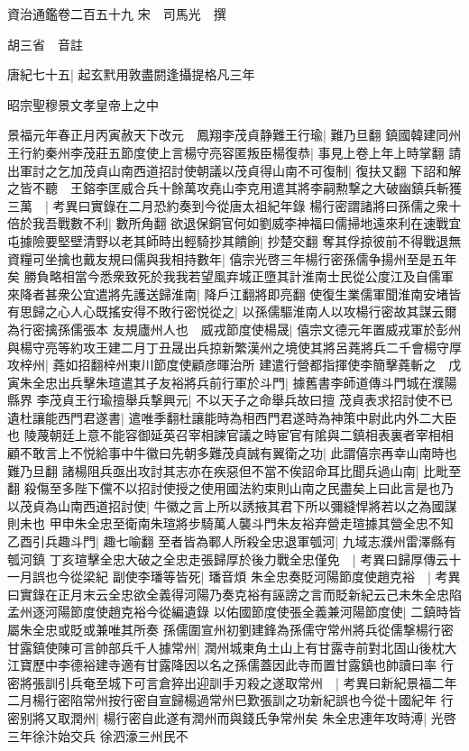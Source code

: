 資治通鑑卷二百五十九
宋　司馬光　撰

胡三省　音註

唐紀七十五|{
	起玄黓用敦盡閼逢攝提格凡三年}


昭宗聖穆景文孝皇帝上之中

景福元年春正月丙寅赦天下改元　鳳翔李茂貞静難王行瑜|{
	難乃旦翻}
鎮國韓建同州王行約秦州李茂莊五節度使上言楊守亮容匿叛臣楊復恭|{
	事見上卷上年上時掌翻}
請出軍討之乞加茂貞山南西道招討使朝議以茂貞得山南不可復制|{
	復扶又翻}
下詔和解之皆不聽　王鎔李匡威合兵十餘萬攻堯山李克用遣其將李嗣勲撃之大破幽鎮兵斬獲三萬　|{
	考異曰實錄在二月恐約奏到今從唐太祖紀年錄}
楊行密謂諸將曰孫儒之衆十倍於我吾戰數不利|{
	數所角翻}
欲退保銅官何如劉威李神福曰儒掃地遠來利在速戰宜屯據險要堅壁清野以老其師時出輕騎抄其饋餉|{
	抄楚交翻}
奪其俘掠彼前不得戰退無資糧可坐擒也戴友規曰儒與我相持數年|{
	僖宗光啓三年楊行密孫儒争揚州至是五年矣}
勝負略相當今悉衆致死於我我若望風弃城正墮其計淮南士民從公度江及自儒軍來降者甚衆公宜遣將先護送歸淮南|{
	降戶江翻將即亮翻}
使復生業儒軍聞淮南安堵皆有思歸之心人心既搖安得不敗行密悦從之|{
	以孫儒驅淮南人以攻楊行密故其謀云爾為行密擒孫儒張本}
友規廬州人也　威戎節度使楊晟|{
	僖宗文德元年置威戎軍於彭州}
與楊守亮等約攻王建二月丁丑晟出兵掠新繁漢州之境使其將呂蕘將兵二千會楊守厚攻梓州|{
	蕘如招翻梓州東川節度使顧彦暉治所}
建遣行營都指揮使李簡擊蕘斬之　戊寅朱全忠出兵擊朱瑄遣其子友裕將兵前行軍於斗門|{
	據舊書李師道傳斗門城在濮陽縣界}
李茂貞王行瑜擅舉兵撃興元|{
	不以天子之命舉兵故曰擅}
茂貞表求招討使不已遺杜讓能西門君遂書|{
	遣唯季翻杜讓能時為相西門君遂時為神策中尉此内外二大臣也}
陵蔑朝廷上意不能容御延英召宰相諫官議之時宦官有隂與二鎮相表裏者宰相相顧不敢言上不悦給事中牛徽曰先朝多難茂貞誠有翼衛之功|{
	此謂僖宗再幸山南時也難乃旦翻}
諸楊阻兵亟出攻討其志亦在疾惡但不當不俟詔命耳比聞兵過山南|{
	比毗至翻}
殺傷至多陛下儻不以招討使授之使用國法約束則山南之民盡矣上曰此言是也乃以茂貞為山南西道招討使|{
	牛徽之言上所以誘掖其君下所以彌縫悍將若以之為國謀則未也}
甲申朱全忠至衛南朱瑄將步騎萬人襲斗門朱友裕弃營走瑄據其營全忠不知乙酉引兵趣斗門|{
	趣七喻翻}
至者皆為鄆人所殺全忠退軍瓠河|{
	九域志濮州雷澤縣有瓠河鎮}
丁亥瑄擊全忠大破之全忠走張歸厚於後力戰全忠僅免　|{
	考異曰歸厚傳云十一月誤也今從梁紀}
副使李璠等皆死|{
	璠音煩}
朱全忠奏貶河陽節度使趙克裕　|{
	考異曰實錄在正月末云全忠欲全義得河陽乃奏克裕有誣謗之言而貶新紀云己未朱全忠陷孟州逐河陽節度使趙克裕今從編遺錄}
以佑國節度使張全義兼河陽節度使|{
	二鎮時皆屬朱全忠或貶或兼唯其所奏}
孫儒圍宣州初劉建鋒為孫儒守常州將兵從儒撃楊行密甘露鎮使陳可言帥部兵千人據常州|{
	潤州城東角土山上有甘露寺前對北固山後枕大江寶歷中李德裕建寺適有甘露降因以名之孫儒蓋因此寺而置甘露鎮也帥讀曰率}
行密將張訓引兵奄至城下可言倉猝出迎訓手刃殺之遂取常州　|{
	考異曰新紀景福二年二月楊行密陷常州按行密自宣歸楊過常州巳歎張訓之功新紀誤也今從十國紀年}
行密别將又取潤州|{
	楊行密自此遂有潤州而與錢氏争常州矣}
朱全忠連年攻時溥|{
	光啓三年徐汴始交兵}
徐泗濠三州民不

